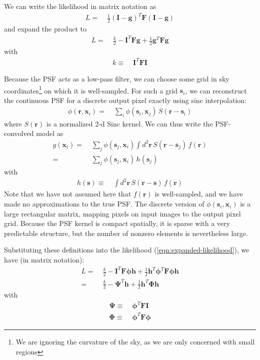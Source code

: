 \documentclass[10pt]{article}
\newcommand{\eqnref}[1]{(\ref{eqn:#1})}
\begin{document}
We can write the likelihood in matrix notation as
\begin{align}
L =\;& \frac{1}{2}
        \left(\bm{I} - \bm{g}\right)^T\!
        \bm{F}
        \left(\bm{I} - \bm{g}\right)
\end{align}
and expand the product to
\begin{align}
L =\;& \frac{k}{2} - \bm{I}^T\!\bm{F}\bm{g}
        + \frac{1}{2}\bm{g}^T\!\bm{F}\bm{g}
        \label{eqn:expanded-likelihood}
\end{align}
with
\begin{align}
k \equiv\;&
    \bm{I}^T\!\bm{F} \bm{I}
    \label{eqn:k-def}
\end{align}

Because the PSF acts as a low-pass filter, we can choose some grid in sky coordinates\footnote{We are ignoring the curvature of the sky, as we are only concerned with small regions} on which it is well-sampled.  For such a grid $\bm{s}_i$, we can reconstruct the continuous PSF for a discrete output pixel exactly using sinc interpolation:
\begin{align}
\phi(\bm{r},\bm{x}_i) =\;& \sum_{i} \phi(\bm{s}_i,\bm{x}_j)\,
    S(\bm{r}-\bm{s}_i)
    \label{eqn:phi-interpolated}
\end{align}
where $S(\bm{r})$ is a normalized 2-d Sinc kernel.  We can thus write the PSF-convolved model as
\begin{align}
g(\bm{x}_i) =\;& \sum_{j} \phi(\bm{s}_j,\bm{x}_i)
    \int\! d^2 \bm{r} \, S(\bm{r}-\bm{s}_j) \, f(\bm{r}) \\
    =\;& \sum_{j} \phi(\bm{s}_j,\bm{x}_i) \, h(\bm{s}_j)
\end{align}
with
\begin{align}
h(\bm{s}) \equiv\;& \int\! d^2 \bm{r} \, S(\bm{r}-\bm{s}) \, f(\bm{r})
\end{align}
Note that we have not assumed here that $f(\bm{r})$ is well-sampled, and we have made no approximations to the true PSF.  The discrete version of $\phi(\bm{s}_i,\bm{x}_i)$ is a large rectangular matrix, mapping pixels on input images to the output pixel grid.  Because the PSF kernel is compact spatially, it is sparse with a very predictable structure, but the number of nonzero elements is nevertheless large.

Substituting these definitions into the likelihood \eqnref{expanded-likelihood}, we have (in matrix notation):
\begin{align}
L
=\;&
    \frac{k}{2} - \bm{I}^T \! \bm{F} \bm{\phi} \bm{h}
    + \frac{1}{2} \bm{h}^T \! \bm{\phi}^T \! \bm{F} \bm{\phi} \bm{h} \\
=\;& \frac{k}{2} - \bm{\Psi}^T\!\bm{h} + \frac{1}{2}\bm{h}^T\!\bm{\Phi}\bm{h}
\label{eqn:expanded-likelihood-new}
\end{align}
with
\begin{align}
\bm{\Psi} \equiv\;& \bm{\phi}^T\!\bm{F} \bm{I}
    \label{eqn:psi-def}
    \\
\bm{\Phi} \equiv\;& \bm{\phi}^T\!\bm{F} \bm{\phi}
\label{eqn:phi-def}
\end{align}
\end{document}
